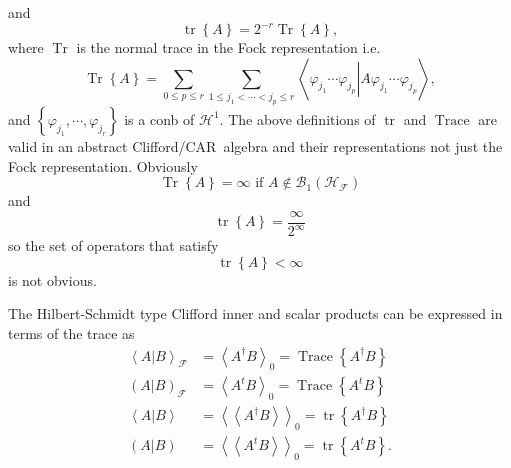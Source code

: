 \documentclass[aps,preprint]{revtex4}%
\begin{document}
and
\begin{equation}
\operatorname*{tr}\left\{  A\right\}  =2^{-r}\operatorname*{Tr}\left\{
A\right\}  ,
\end{equation}
where $\operatorname*{Tr}$ is the normal trace in the Fock representation
i.e.
\begin{equation}
\operatorname*{Tr}\left\{  A\right\}  =\sum_{0\leq p\leq r}\sum_{1\leq
j_{1}<\cdots<j_{p}\leq r}\left\langle \varphi_{j_{1}}\cdots\varphi_{j_{p}%
}\left\vert A\varphi_{j_{1}}\cdots\varphi_{j_{p}}\right.  \right\rangle ,
\end{equation}
and $\left\{  \varphi_{j_{1}},\cdots,\varphi_{j_{r}}\right\}  $ is a conb of
$\mathcal{H}^{1}$. The above definitions of $\operatorname*{tr}$ and
$\operatorname*{Trace}$ are valid in an abstract Clifford/CAR\ algebra and
their representations not just the Fock representation. Obviously
\begin{equation}
\operatorname*{Tr}\left\{  A\right\}  =\infty\text{ if }A\notin\mathcal{B}%
_{1}\left(  \mathcal{H}_{\mathcal{F}}\right)
\end{equation}
and
\begin{equation}
\operatorname*{tr}\left\{  A\right\}  =\frac{\infty}{2^{\infty}}%
\end{equation}
so the set of operators that satisfy
\begin{equation}
\operatorname*{tr}\left\{  A\right\}  <\infty
\end{equation}
is not obvious.

The Hilbert-Schmidt type Clifford inner and scalar products can be expressed
in terms of the trace as
\begin{align}
\left\langle \left.  A\right\vert B\right\rangle _{\mathcal{F}}  &
=\left\langle A^{\dagger}B\right\rangle _{0}=\operatorname*{Trace}\left\{
A^{\dagger}B\right\} \\
\left(  \left.  A\right\vert B\right)  _{\mathcal{F}}  &  =\left\langle
A^{t}B\right\rangle _{0}=\operatorname*{Trace}\left\{  A^{t}B\right\} \\
\left\langle \left.  A\right\vert B\right\rangle  &  =\left\langle
\left\langle A^{\dagger}B\right\rangle \right\rangle _{0}=\operatorname*{tr}%
\left\{  A^{\dagger}B\right\} \\
\left(  \left.  A\right\vert B\right)   &  =\left\langle \left\langle
A^{t}B\right\rangle \right\rangle _{0}=\operatorname*{tr}\left\{
A^{t}B\right\}  .
\end{align}
\end{document}

